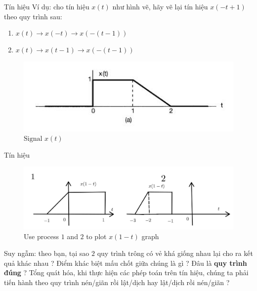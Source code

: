 \documentclass[8pt]{beamer}
\begin{document}
\begin{frame}{Tín hiệu}
	Ví dụ: cho tín hiệu $x(t)$ như hình vẽ, hãy vẽ lại tín hiệu $x(-t+1)$ theo quy trình sau:
	\begin{enumerate}
		\item $x(t)\to x(-t) \to x(-(t-1))$
		\item $x(t)\to x(t-1) \to x(-(t-1))$
	\end{enumerate}
\begin{figure}[h]
			\includegraphics[width=1\textwidth]{a.jpg}
			\caption{$\text{Signal }x(t)$}			\label{fig:re8}
		\end{figure}
	\end{frame}
	\begin{frame}{Tín hiệu}
\begin{figure}[h]
			\includegraphics[width=1\textwidth]{12.jpg}
			\caption{Use process $1$ and $2$ to plot $x(1-t)$ graph}			\label{fig:re9}
		\end{figure}

	Suy ngẫm: theo bạn, tại sao $2$ quy trình trông có vẻ khá giống nhau lại cho ra kết quả khác nhau ? Điểm khác biệt mấu chốt giữa chúng là gì ? Đâu là \textbf{quy trình đúng} ? Tổng quát hóa, khi thực hiện các phép toán trên tín hiệu, chúng ta phải tiến hành theo quy trình \alert{nén/giãn rồi lật/dịch} hay \alert{lật/dịch rồi nén/giãn} ?
	\end{frame}
\end{document}
